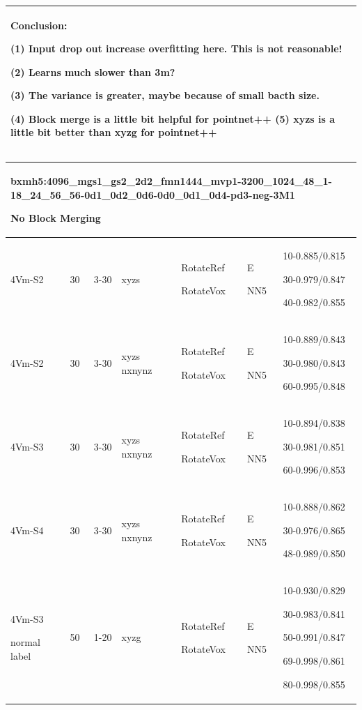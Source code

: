 \documentclass[,table,dvipsnames]{article}
\begin{document}
\begin{tabular}{|p{1.5cm}|p{1.5cm}|p{1cm}|p{1.5cm}|p{1.5cm}|p{1.5cm}|p{5cm}| }
	\multicolumn{7}{|p{16cm}|}{ Conclusion:\par	
	(1) Input drop out increase overfitting here. This is not reasonable!\par
	(2) Learns much slower than 3m?\par 
	(3) The variance is greater, maybe because of small bacth size.\par 
	(4) Block merge is a little bit helpful for pointnet++
	(5) xyzs is a little bit better than xyzg for pointnet++ } \\
	\hline 
	
\end{tabular}

\noindent
\begin{tabular}{|p{1.5cm}|p{1.5cm}|p{1cm}|p{1.5cm}|p{1.5cm}|p{1.5cm}|p{5cm}| }
	\hline 
	\multicolumn{7}{|p{14cm}|}{bxmh5:4096\_mgs1\_gs2\_2d2\_fmn1444\_mvp1-3200\_1024\_48\_1-18\_24\_56\_56-0d1\_0d2\_0d6-0d0\_0d1\_0d4-pd3-neg-3M1\par No Block Merging }\\
	\hline
	4Vm-S2 & 30 & 3-30 & xyzs & RotateRef\par RotateVox & E\par NN5 & 10-0.885/0.815\par 30-0.979/0.847 \par40-0.982/0.855\\
	\hline
	4Vm-S2 & 30 & 3-30 & xyzs nxnynz & RotateRef\par RotateVox & E\par NN5 & 10-0.889/0.843\par 30-0.980/0.843\par 60-0.995/0.848\\
	\hline
	4Vm-S3 & 30 & 3-30 & xyzs nxnynz & RotateRef\par RotateVox & E\par NN5 & 10-0.894/0.838\par 30-0.981/0.851\par 60-0.996/0.853\\
	\hline
	4Vm-S4 & 30 & 3-30 & xyzs nxnynz & RotateRef\par RotateVox & E\par NN5 & 10-0.888/0.862\par 30-0.976/0.865\par 48-0.989/0.850\\
	\hline\hline
	4Vm-S3\par normal label & 50 & 1-20 & xyzg& RotateRef\par RotateVox & E\par NN5 & 10-0.930/0.829\par 30-0.983/0.841\par 50-0.991/0.847\par 69-0.998/0.861\par 80-0.998/0.855\\

\end{tabular}
\end{document}
